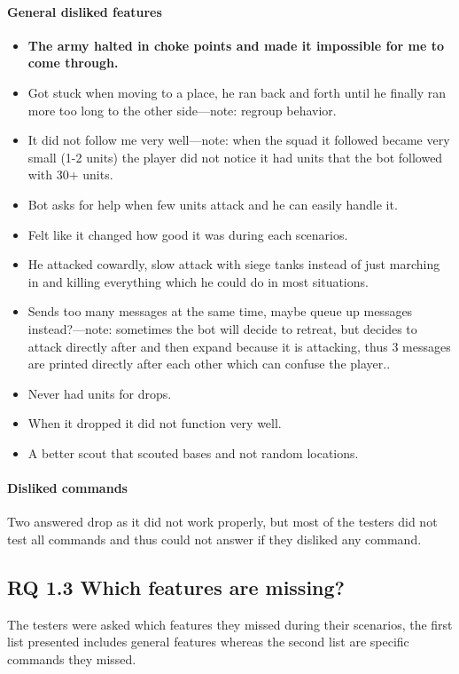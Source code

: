 \paragraph{General disliked features}
\begin{itemize}
	\item \textbf{The army halted in choke points and made it impossible for me to come through.}
	\item Got stuck when moving to a place, he ran back and forth until he finally ran more too long
		to the other side—note: regroup behavior.
	\item It did not follow me very well—note: when the squad it followed became very small (1-2
		units) the player did not notice it had units that the bot followed with 30+ units.
	\item Bot asks for help when few units attack and he can easily handle it.
	\item Felt like it changed how good it was during each scenarios.
	\item He attacked cowardly, slow attack with siege tanks instead of just marching in and killing
		everything which he could do in most situations.
	\item Sends too many messages at the same time, maybe queue up messages instead?—note: sometimes
		the bot will decide to retreat, but decides to attack directly after and then expand
		because it is attacking, thus 3 messages are printed directly after each other which can
		confuse the player..
	\item Never had units for drops.
	\item When it dropped it did not function very well.
	\item A better scout that scouted bases and not random locations.
\end{itemize}

\paragraph{Disliked commands}Two answered drop as it did not work properly, but most of the testers did not test all commands and thus could not answer if they disliked any command.

\subsection{RQ 1.3 Which features are missing?}
The testers were asked which features they missed during their scenarios, the first list presented includes general features whereas the second list are specific commands they missed.
